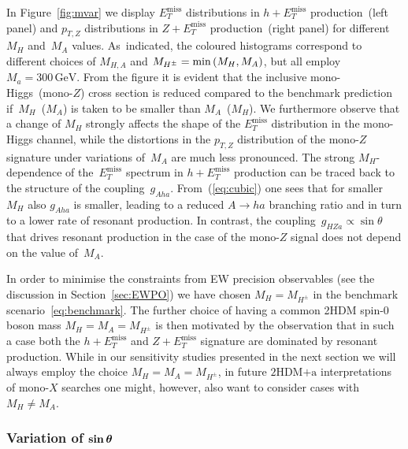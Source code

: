 \documentclass[review]{elsarticle}
\newcommand{\MET}{\ensuremath{E_T^\mathrm{miss}}\xspace}
\newcommand{\mA}{\ensuremath{M_{A}}\xspace}
\newcommand{\mH}{\ensuremath{M_{H}}\xspace}
\newcommand{\mHc}{\ensuremath{M_{H^{\pm}}}\xspace}
\newcommand{\hdma}{\ensuremath{\textrm{2HDM+a}}\xspace}
\def\bm#1{\mbox{\boldmath$#1$\unboldmath}}
\begin{document}
In Figure~\ref{fig:mvar} we display $\MET$ distributions in $h + \MET$ production~(left panel) and $p_{T,Z}$ distributions in $Z+\MET$ production~(right panel) for different~$\mH$ and~$\mA$ values. As~indicated, the coloured histograms correspond to  different choices of $M_{H,A}$ and $\mHc = {\rm min} \left ( \mH, \mA \right )$, but all employ $M_a = 300 \, {\mathrm{GeV}}$. From the figure it is evident that the inclusive mono-Higgs~(mono-$Z$) cross section is reduced compared to the benchmark prediction if~$\mH$~($\mA$) is taken to be smaller than $\mA$~($\mH$).  We furthermore observe that  a change of $\mH$ strongly affects the shape of the $\MET$ distribution in the mono-Higgs channel, while the distortions in the $p_{T,Z}$ distribution of the mono-$Z$ signature under variations of~$\mA$ are much less pronounced. The strong $M_H$-dependence of the~$\MET$ spectrum in $h + \MET$ production can be traced back to the structure of the coupling~$g_{Aha}$. From~(\ref{eq:cubic}) one sees that for smaller~$M_H$ also $g_{Aha}$ is smaller, leading to a reduced $A \to ha$ branching ratio  and in turn to a lower rate of resonant production.  In contrast, the coupling~$g_{HZa} \propto \sin \theta$ that drives resonant production in the case of the mono-$Z$ signal does not depend on the value of~$M_A$.

In order to minimise the constraints from EW precision observables (see the discussion in Section~\ref{sec:EWPO}) we have chosen $\mH = \mHc$ in the  benchmark scenario~\eqref{eq:benchmark}. The further choice of having a common 2HDM  spin-0 boson  mass $\mH = \mA = \mHc$ is then motivated by the observation that in such a case  both the $h + \MET$ and $Z + \MET$ signature are dominated by resonant production. While in our sensitivity studies presented in the next section we will always employ the choice $\mH = \mA = \mHc$, in future \hdma  interpretations of mono-$X$ searches one might, however,  also want to consider cases with~$\mH \neq \mA$. 

\subsubsection[Variation of $\sin \theta$]{Variation of $\bm{\sin \theta}$}
\end{document}
